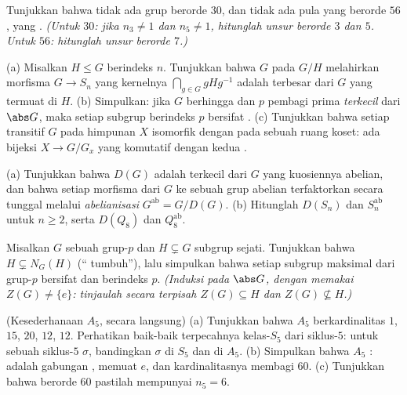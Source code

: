\begin{exercise}[$\star\star$]\label{exo:b3:groups:7}
Tunjukkan bahwa tidak ada grup berorde $30$, dan tidak ada pula yang berorde $56$, yang
. \emph{(Untuk $30$: jika $n_3 \neq 1$ dan $n_5 \neq 1$, hitunglah
unsur berorde $3$ dan $5$. Untuk $56$: hitunglah unsur
berorde $7$.)}
\end{exercise}

\begin{exercise}[$\star\star$]\label{exo:b3:groups:8}
(a) Misalkan $H \leq G$ berindeks $n$. Tunjukkan bahwa  $G$ pada
$G/H$ melahirkan morfisma $G \to S_n$ yang kernelnya $\bigcap_{g \in
G} gHg^{-1}$ adalah  terbesar dari $G$ yang termuat di
$H$.
(b) Simpulkan: jika $G$ berhingga dan $p$ pembagi prima \emph{terkecil}
dari $\abs G$, maka setiap subgrup berindeks $p$ bersifat .
(c) Tunjukkan bahwa setiap  transitif $G$ pada himpunan $X$
isomorfik dengan  pada sebuah ruang koset: ada bijeksi $X
\to G/G_x$ yang komutatif dengan kedua .
\end{exercise}

\begin{exercise}[$\star\star$]\label{exo:b3:groups:9}
(a) Tunjukkan bahwa $D(G)$ adalah  terkecil dari $G$ yang
kuosiennya abelian, dan bahwa setiap morfisma dari $G$ ke sebuah grup
abelian terfaktorkan secara tunggal melalui \emph{abelianisasi}
$G^{\mathrm{ab}} = G/D(G)$.
(b) Hitunglah $D(S_n)$ dan $S_n^{\mathrm{ab}}$ untuk $n \geq 2$, serta
$D(Q_8)$ dan $Q_8^{\mathrm{ab}}$.
\end{exercise}

\begin{exercise}[$\star\star$]\label{exo:b3:groups:10}
Misalkan $G$ sebuah grup-$p$ dan $H \subsetneq G$ subgrup sejati.
Tunjukkan bahwa $H \subsetneq N_G(H)$ (`` tumbuh''), lalu simpulkan
bahwa setiap subgrup maksimal dari grup-$p$ bersifat  dan berindeks $p$.
\emph{(Induksi pada $\abs G$, dengan memakai $Z(G) \neq \{e\}$: tinjaulah
secara terpisah $Z(G) \subseteq H$ dan $Z(G) \not\subseteq H$.)}
\end{exercise}

\begin{exercise}[$\star\star\star$]\label{exo:b3:groups:11}
(Kesederhanaan $A_5$, secara langsung)
(a) Tunjukkan bahwa  $A_5$ berkardinalitas
$1$, $15$, $20$, $12$, $12$. Perhatikan baik-baik terpecahnya
kelas-$S_5$ dari siklus-$5$: untuk sebuah siklus-$5$ $\sigma$, bandingkan
 $\sigma$ di $S_5$ dan di $A_5$.
(b) Simpulkan bahwa $A_5$ :  adalah gabungan
, memuat $e$, dan kardinalitasnya membagi
$60$.
(c) Tunjukkan bahwa  berorde $60$ pastilah mempunyai $n_5 =
6$.
\end{exercise}

